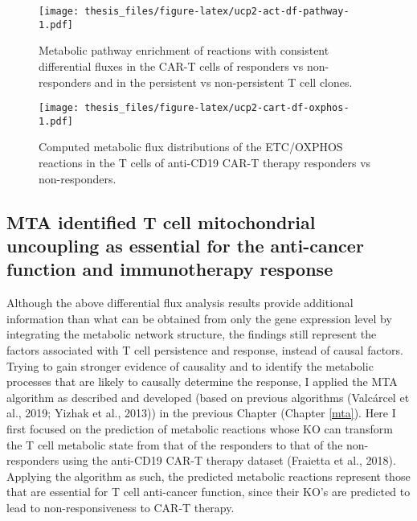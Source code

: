 \documentclass[12pt,twoside,openany,\mydriver]{thesis}  %
\begin{document}
\begin{figure}
\centering
\texttt{[image: thesis\_files/figure-latex/ucp2-act-df-pathway-1.pdf]}
\caption{\label{fig:ucp2-act-df-pathway}Metabolic pathway enrichment of reactions with consistent differential fluxes in the CAR-T cells of responders vs non-responders and in the persistent vs non-persistent T cell clones.}
\end{figure}
\begin{figure}
\centering
\texttt{[image: thesis\_files/figure-latex/ucp2-cart-df-oxphos-1.pdf]}
\caption{\label{fig:ucp2-cart-df-oxphos}Computed metabolic flux distributions of the ETC/OXPHOS reactions in the T cells of anti-CD19 CAR-T therapy responders vs non-responders.}
\end{figure}
\hypertarget{mta-identified-t-cell-mitochondrial-uncoupling-as-essential-for-the-anti-cancer-function-and-immunotherapy-response}{%
\subsection{MTA identified T cell mitochondrial uncoupling as essential for the anti-cancer function and immunotherapy response}\label{mta-identified-t-cell-mitochondrial-uncoupling-as-essential-for-the-anti-cancer-function-and-immunotherapy-response}}

Although the above differential flux analysis results provide additional information than what can be obtained from only the gene expression level by integrating the metabolic network structure, the findings still represent the factors associated with T cell persistence and response, instead of causal factors. Trying to gain stronger evidence of causality and to identify the metabolic processes that are likely to causally determine the response, I applied the MTA algorithm as described and developed (based on previous algorithms (Valcárcel et al., 2019; Yizhak et al., 2013)) in the previous Chapter (Chapter \ref{mta}). Here I first focused on the prediction of metabolic reactions whose KO can transform the T cell metabolic state from that of the responders to that of the non-responders using the anti-CD19 CAR-T therapy dataset (Fraietta et al., 2018). Applying the algorithm as such, the predicted metabolic reactions represent those that are essential for T cell anti-cancer function, since their KO's are predicted to lead to non-responsiveness to CAR-T therapy.
\end{document}
